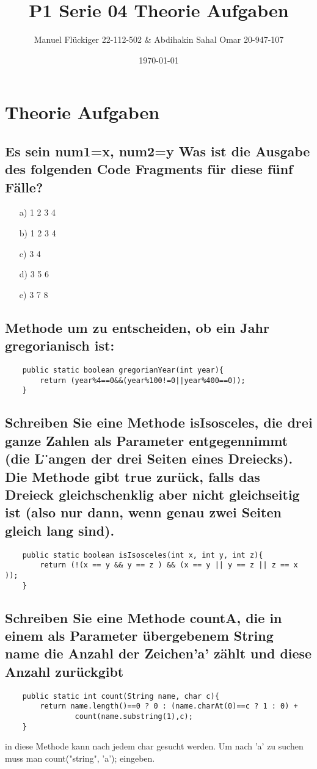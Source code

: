 \documentclass{article}
\author{Manuel Flückiger 22-112-502 & Abdihakin Sahal Omar 20-947-107}
\title{P1 Serie 04 Theorie Aufgaben}
\date{\today}
\begin{document}
\maketitle
\section {Theorie Aufgaben}
\subsection{Es sein num1=x, num2=y 
\newline Was ist die Ausgabe des folgenden Code Fragments für diese fünf Fälle?}
\begin{enumerate}
    \item [a)]1 2 3 4
    \item [b)]1 2 3 4
    \item [c)]3 4
    \item [d)]3 5 6
    \item [e)]3 7 8
\end{enumerate}
\subsection{Methode um zu entscheiden, ob ein Jahr gregorianisch ist:}
\begin{verbatim}
    public static boolean gregorianYear(int year){
        return (year%4==0&&(year%100!=0||year%400==0));
    }
\end{verbatim}
\subsection{Schreiben Sie eine Methode isIsosceles, die drei ganze Zahlen als 
Parameter entgegennimmt (die L ̈angen der drei Seiten eines Dreiecks). 
Die Methode  gibt true zurück,  falls  das  Dreieck  gleichschenklig 
aber nicht gleichseitig ist (also nur dann, wenn genau zwei Seiten gleich lang sind).}
\begin{verbatim}
    public static boolean isIsosceles(int x, int y, int z){
        return (!(x == y && y == z ) && (x == y || y == z || z == x ));
    }
\end{verbatim}
\subsection{ Schreiben Sie eine Methode countA, die in einem als Parameter 
übergebenem String name die Anzahl der Zeichen'a' zählt und diese Anzahl zurückgibt}
\begin{verbatim}
    public static int count(String name, char c){
        return name.length()==0 ? 0 : (name.charAt(0)==c ? 1 : 0) + 
                count(name.substring(1),c);
    }
\end{verbatim}
in diese Methode kann nach jedem char gesucht werden. Um nach 'a' zu 
suchen muss man count("string", 'a'); eingeben.
\end{document}
